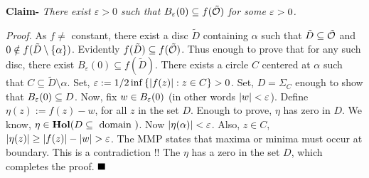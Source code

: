 \documentclass[../ComplexAnalysis_Notes.tex]{subfiles}
\begin{document}
\vspace*{0.2cm}

\noindent \textbf{\textsf{Claim- }} \textit{There exist $\varepsilon>0$ such that $B_{\varepsilon}(0)\subseteq f(\tilde{\mathcal{O}})$ for some $\varepsilon>0$. }

\vspace*{0.1cm}

\noindent \textit{Proof.} As $f\neq$ constant, there exist a disc $\tilde{D}$ containing $\alpha$ such that $\tilde{D}\subseteq \tilde{\mathcal{O}}$ and $0 \notin f(\tilde{D}\setminus \qty{\alpha})$. Evidently $f(\tilde{D})\subseteq f(\tilde{\mathcal{O}})$. Thus enough to prove that for any such disc, there exist $B_{\varepsilon}(0) \subseteq f(\tilde{D})$. There exists a circle $C$ centered at $\alpha$ such that $C \subseteq \tilde{D}\setminus \alpha$. Set, $\varepsilon := 1/2 \inf \qty{\abs{f(z)}:z \in C}>0$. Set, $D = \Sigma_{C}$ enough to show that $B_{\varepsilon}(0) \subseteq D$. Now, fix $w \in B_{\varepsilon}(0)$ (in other words $\abs{w}<\varepsilon$). Define $\eta(z):= f(z)-w$, for all $z$ in the set $D$. Enough to prove, $\eta$ has zero in $D$. We know, $\eta \in \operatorname{\mathbf{Hol}}(D \subseteq \text{ domain })$. Now $\abs{\eta(\alpha)}<\varepsilon$. Also, $z \in C$, $\abs{\eta(z)}\geq \abs{f(z)}-\abs{w} > \varepsilon$. The MMP states that maxima or minima must occur at boundary. This is a contradiction !! The $\eta$ has a zero in the set $D$, which completes the proof. $\hfill \blacksquare$
 
\end{document}
